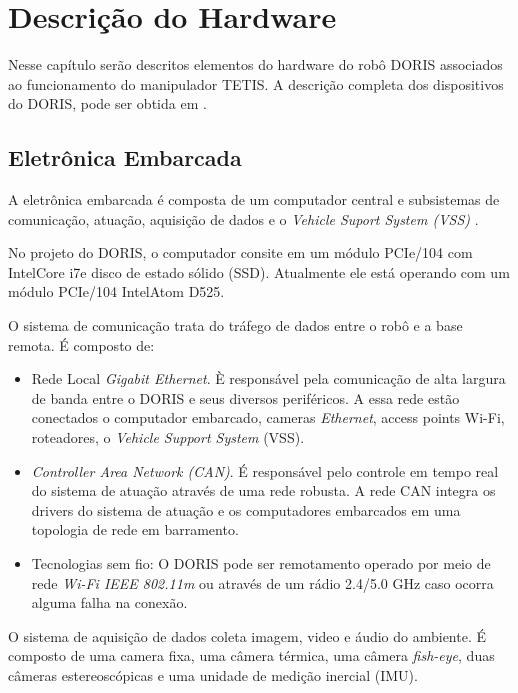\chapter{Descrição do Hardware} \label{chap:descricao_hard}

Nesse capítulo serão descritos elementos do hardware do robô DORIS associados ao funcionamento do manipulador TETIS. A descrição completa dos dispositivos do DORIS, pode ser obtida em \citep{xaud2016doris, nunes2013doris, freitas2015embedded, galassi2014doris}.

\section{Eletrônica Embarcada}

A eletrônica embarcada é composta de um computador central e subsistemas de comunicação, atuação, aquisição de dados e o \textit{Vehicle Suport System (VSS)} \citep{freitas2015embedded}. 

No projeto do DORIS, o computador consite em um módulo PCIe/104 com Intel\circledR Core i7\texttrademark e disco de estado sólido (SSD). Atualmente ele está operando com um módulo PCIe/104 Intel\circledR Atom D525. 

O sistema de comunicação trata do tráfego de dados entre o robô e a base remota. É composto de:

\begin{itemize}
\item Rede Local \textit{Gigabit Ethernet}. È responsável pela comunicação de alta largura de banda entre o DORIS e seus diversos periféricos. A essa rede estão conectados o computador embarcado, cameras \textit{Ethernet}, access points Wi-Fi, roteadores, o \textit{Vehicle Support System} (VSS).
\item \textit{Controller Area Network (CAN)}. É responsável pelo controle em tempo real do sistema de atuação através de uma rede robusta. A rede CAN integra os drivers do sistema de atuação e os computadores embarcados em uma topologia de rede em barramento. 

\item Tecnologias sem fio: O DORIS pode ser remotamento operado por meio de rede \textit{Wi-Fi IEEE 802.11m} ou através de um rádio 2.4/5.0 GHz caso ocorra alguma falha na conexão.
\end{itemize}

O sistema de aquisição de dados coleta imagem, video e áudio do ambiente. É composto de uma camera fixa, uma câmera térmica, uma câmera \textit{fish-eye}, duas câmeras estereoscópicas e uma unidade de medição inercial (IMU).

